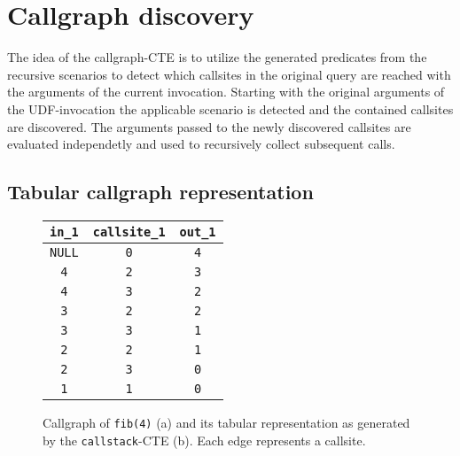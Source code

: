 \section{Callgraph discovery}

The idea of the callgraph-CTE is to utilize the generated predicates from the recursive scenarios to detect which callsites in the original query are reached with the arguments of the current invocation.
Starting with the original arguments of the UDF-invocation the applicable scenario is detected and the contained callsites are discovered. The arguments passed to the newly discovered callsites are evaluated independetly and used to recursively collect subsequent calls.

\subsection{Tabular callgraph representation}

\begin{figure}[h!]\small
    \begin{minipage}[b]{.5\linewidth}
    \centering
    
    \label{fig:fib_callstack_graph}
    \end{minipage}%
    \begin{minipage}[b]{.5\linewidth}
    \centering
     
    \begin{tabular}{c|c|c}
        \texttt{in\_1} & \texttt{callsite\_1} & \texttt{out\_1} \\
        \hline
        \hline
        \texttt{NULL} & \texttt{0} & \texttt{4}\\
        \texttt{4} & \texttt{2} & \texttt{3}\\
        \texttt{4} & \texttt{3} & \texttt{2}\\
        \hline
        \hline
        \texttt{3} & \texttt{2} & \texttt{2}\\
        \texttt{3} & \texttt{3} & \texttt{1}\\
        \texttt{2} & \texttt{2} & \texttt{1}\\
        \texttt{2} & \texttt{3} & \texttt{0}\\
        \hline
        \texttt{1} & \texttt{1} & \texttt{0}\\
        \hline
    \end{tabular}
    \label{fig:fib_callstack_table}
    \end{minipage}
    \caption{Callgraph of \texttt{fib(4)} (a) and its tabular representation as generated by the \texttt{callstack}-CTE (b). Each edge represents a callsite.}\label{fig:fib_callstack}
\end{figure}

